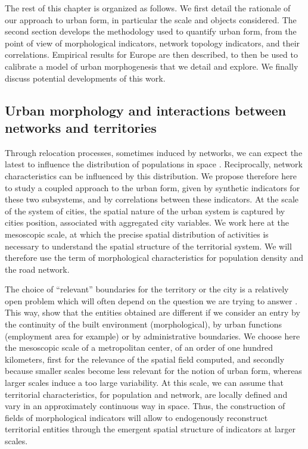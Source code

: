\documentclass[11pt]{article}
\begin{document}
The rest of this chapter is organized as follows. We first detail the rationale of our approach to urban form, in particular the scale and objects considered. The second section develops the methodology used to quantify urban form, from the point of view of morphological indicators, network topology indicators, and their correlations. Empirical results for Europe are then described, to then be used to calibrate a model of urban morphogenesis that we detail and explore. We finally discuss potential developments of this work.


\subsection{Urban morphology and interactions between networks and territories}

Through relocation processes, sometimes induced by networks, we can expect the latest to influence the distribution of populations in space \citep{wegener2004land}. Reciprocally, network characteristics can be influenced by this distribution. We propose therefore here to study a coupled approach to the urban form, given by synthetic indicators for these two subsystems, and by correlations between these indicators. At the scale of the system of cities, the spatial nature of the urban system is captured by cities position, associated with aggregated city variables. We work here at the mesoscopic scale, at which the precise spatial distribution of activities is necessary to understand the spatial structure of the territorial system. We will therefore use the term of morphological characteristics for population density and the road network.

The choice of ``relevant'' boundaries for the territory or the city is a relatively open problem which will often depend on the question we are trying to answer \citep{paez2005spatial}. This way, \cite{guerois2002commune} show that the entities obtained are different if we consider an entry by the continuity of the built environment (morphological), by urban functions (employment area for example) or by administrative boundaries. We choose here the mesoscopic scale of a metropolitan center, of an order of one hundred kilometers, first for the relevance of the spatial field computed, and secondly because smaller scales become less relevant for the notion of urban form, whereas larger scales induce a too large variability. At this scale, we can assume that territorial characteristics, for population and network, are locally defined and vary in an approximately continuous way in space. Thus, the construction of fields of morphological indicators will allow to endogenously reconstruct territorial entities through the emergent spatial structure of indicators at larger scales. 
\end{document}
